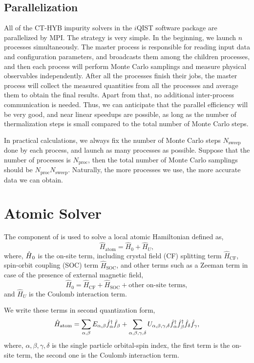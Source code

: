 \subsection{Parallelization}
All of the CT-HYB impurity solvers in the $i$QIST software package are parallelized by MPI. The strategy is very simple. In the beginning, we launch $n$ processes simultaneously. The master process is responsible for reading input data and configuration parameters, and broadcasts them among the children processes, and then each process will perform Monte Carlo samplings and measure physical observables independently. After all the processes finish their jobs, the master process will collect the measured quantities from all the processes and average them to obtain the final results. Apart from that, no additional inter-process communication is needed. Thus, we can anticipate that the parallel efficiency will be very good, and near linear speedups are possible, as long as the number of thermalization steps is small compared to the total number of Monte Carlo steps. 

In practical calculations, we always fix the number of Monte Carlo steps $N_{\text{sweep}}$ done by each process, and launch as many processes as possible. Suppose that the number of processes is $N_{\text{proc}}$, then the total number of Monte Carlo samplings should be $N_{\text{proc}}N_{\text{sweep}}$. Naturally, the more processes we use, the more accurate data we can obtain.

\section{Atomic Solver}
The \jasmine component of \iqist is used to solve a local atomic Hamiltonian defined as,
\begin{equation}
\hat{H}_{\text{atom}}=\hat{H}_{0}+\hat{H}_{U},
\end{equation}
where, $\text{\ensuremath{\hat{H}}}_{0}$ is the on-site term, including crystal field (CF) splitting term $\hat{H}_{\text{CF}}$, spin-orbit coupling (SOC) term $\hat{H}_{\text{SOC}}$, and other terms such as a Zeeman term in case of the presence of external magnetic field,
\begin{equation}
\hat{H}_{0}=\hat{H}_{\text{CF}}+\hat{H}_{\text{SOC}}+\text{other on-site terms},
\end{equation}
and $\hat{H}_{U}$ is the Coulomb interaction term.

We write these terms in second quantization form, 
\begin{equation}
\hat{H}_{\text{atom}}=\sum_{\alpha,\beta}E_{\alpha,\beta}\hat{f}_{\alpha}^{\dagger}\hat{f}_{\beta}\\
                     +\sum_{\alpha,\beta,\gamma,\delta}U_{\alpha,\beta,\gamma,\delta}\hat{f}_{\alpha}^{\dagger}\\
                     \hat{f}_{\beta}^{\dagger}\hat{f}_{\delta}\hat{f}_{\gamma},
\end{equation}
where, $\alpha,\beta,\gamma,\delta$ is the single particle orbital-spin index, the first term is the on-site term, the second one is the Coulomb interaction term.

